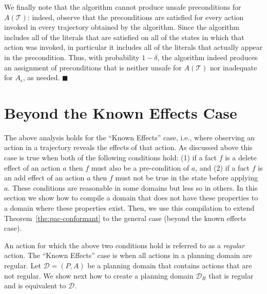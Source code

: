 \documentclass[letterpaper]{article}
\newenvironment{proof}{\noindent{\bf Proof:~~}}{\qed}
\newcommand{\qed}{\hfill\ensuremath{\blacksquare}}
\begin{document}
\begin{proof}

We finally note that the algorithm cannot produce unsafe preconditions for $A(\mathcal{T})$: indeed, observe that the preconditions are satisfied for every action invoked in every trajectory obtained by the algorithm. Since the algorithm includes all of the literals that are satisfied on all of the states in which that action was invoked, in particular it includes all of the literals that actually appear in the precondition. Thus, with probability $1-\delta$, the algorithm indeed produces an assignment of preconditions that is neither unsafe for $A(\mathcal{T})$ nor inadequate for $A_\epsilon$, as needed.
\end{proof}

\section{Beyond the Known Effects Case}
The above analysis holds for the ``Known Effects'' case, i.e., where observing an action in a trajectory reveals the effects of that action. As discussed above this case is true when both of the following conditions hold:
(1) if a fact $f$ is a delete effect of an action $a$ then 
$f$ must also be a pre-condition of $a$, and
(2) if a fact $f$ is an add effect of an action $a$ then 
$f$ must not be true in the state before applying $a$. 
These conditions are reasonable in some domains but less so in others. In this section we show how to compile a domain that does not have these properties to a domain where these properties exist.
Then, we use this compilation to extend Theorem~\ref{the:pac-conformant} to the general case (beyond the known effects case). 


An action for which the above two conditions hold is referred to as a {\em regular} action. The ``Known Effects'' case is when all actions in a planning domain are regular. 
Let $\mathcal{D}=(P,A)$ be a planning domain that contains actions that are not regular. We show next how to create a planning domain $\mathcal{D}_R$ that is regular and is equivalent to $\mathcal{D}$. 
\end{document}
